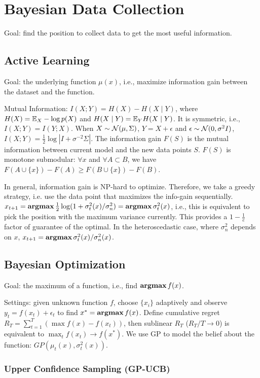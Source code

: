 \section{Bayesian Data Collection}

Goal: find the position to collect data to get the most useful information.

\subsection{Active Learning}

Goal: the underlying function $\mu(x)$, i.e., maximize information gain between the dataset and the function.

Mutual Information: $I(X;Y) = H(X)-H(X\mid Y)$, where $H(X)=\mathbb{E}_X -\log p(X)$ and $H(X\mid Y)=\mathbb{E}_Y H(X\mid Y)$. It is symmetric, i.e., $I(X;Y)=I(Y;X)$. When $X\sim\mathcal{N}(\mu,\Sigma)$, $Y=X+\epsilon$ and $\epsilon\sim\mathcal{N}(0,\sigma^2I)$, $I(X;Y)=\frac{1}{2}\log|I+\sigma^{-2}\Sigma|$. The information gain $F(S)$ is the mutual information between current model and the new data points $S$.
$F(S)$ is monotone submodular: $\forall x$ and $\forall A\subset B$, we have $F(A\cup\{x\})-F(A) \ge F(B\cup\{x\})-F(B)$.

In general, information gain is NP-hard to optimize. Therefore, we take a greedy strategy, i.e. use the data point that maximizes the info-gain sequentially. $x_{t+1}=\operatorname{\textbf{argmax}} \frac{1}{2}\log(1+\sigma_t^2(x)/\sigma_n^2) = \operatorname{\textbf{argmax}} \sigma_t^2(x)$, i.e., this is equivalent to pick the position with the maximum variance currently. This provides a $1-\frac{1}{e}$ factor of guarantee of the optimal. In the heteroscedastic case, where $\sigma_n^2$ depends on $x$, $x_{t+1}=\operatorname{\textbf{argmax}} \sigma_t^2(x)/\sigma_n^2(x)$.

\subsection{Bayesian Optimization}

Goal: the maximum of a function, i.e., find $\operatorname{\textbf{argmax}} f(x)$.

Settings: given unknown function $f$, choose $\{x_i\}$ adaptively and observe $y_t=f(x_t)+\epsilon_t$ to find $x^*=\operatorname{\textbf{argmax}} f(x)$. Define cumulative regret $R_T=\sum_{t=1}^T (\max f(x)-f(x_t))$, then sublinear $R_T$ ($R_T/T\rightarrow 0$) is equivalent to $\max_t f(x_t)\rightarrow f(x^*)$. We use GP to model the belief about the function: $GP(\mu_t(x), \sigma^2_t(x))$.

\subsubsection*{Upper Confidence Sampling (GP-UCB)}

